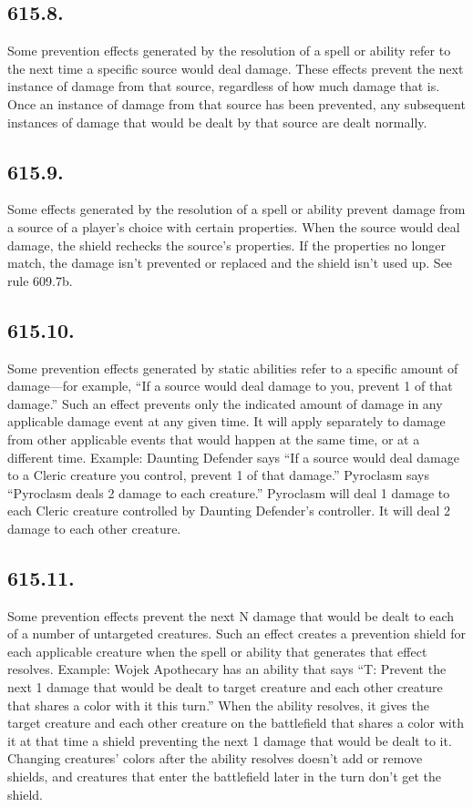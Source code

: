 \subsection*{615.8.}
Some prevention effects generated by the resolution of a spell or ability refer to the next time a specific source would deal damage. These effects prevent the next instance of damage from that source, regardless of how much damage that is. Once an instance of damage from that source has been prevented, any subsequent instances of damage that would be dealt by that source are dealt normally.

\subsection*{615.9.}
Some effects generated by the resolution of a spell or ability prevent damage from a source of a player’s choice with certain properties. When the source would deal damage, the shield rechecks the source’s properties. If the properties no longer match, the damage isn’t prevented or replaced and the shield isn’t used up. See rule 609.7b.

\subsection*{615.10.}
Some prevention effects generated by static abilities refer to a specific amount of damage—for example, “If a source would deal damage to you, prevent 1 of that damage.” Such an effect prevents only the indicated amount of damage in any applicable damage event at any given time. It will apply separately to damage from other applicable events that would happen at the same time, or at a different time.
Example: Daunting Defender says “If a source would deal damage to a Cleric creature you control, prevent 1 of that damage.” Pyroclasm says “Pyroclasm deals 2 damage to each creature.” Pyroclasm will deal 1 damage to each Cleric creature controlled by Daunting Defender’s controller. It will deal 2 damage to each other creature.

\subsection*{615.11.}
Some prevention effects prevent the next N damage that would be dealt to each of a number of untargeted creatures. Such an effect creates a prevention shield for each applicable creature when the spell or ability that generates that effect resolves.
Example: Wojek Apothecary has an ability that says “{T}: Prevent the next 1 damage that would be dealt to target creature and each other creature that shares a color with it this turn.” When the ability resolves, it gives the target creature and each other creature on the battlefield that shares a color with it at that time a shield preventing the next 1 damage that would be dealt to it. Changing creatures’ colors after the ability resolves doesn’t add or remove shields, and creatures that enter the battlefield later in the turn don’t get the shield.

